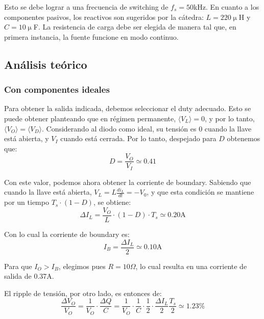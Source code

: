 \documentclass[e4_tp1_main.tex]{subfiles}
\begin{document}
Esto se debe lograr a una frecuencia de switching de $f_s = 50$kHz. En cuanto a los componentes pasivos, los reactivos son sugeridos por la c\'atedra: $L=220\upmu$H y $C=10\upmu$F. La resistencia de carga  debe ser elegida de manera tal que, en primera instancia, la fuente funcione en modo continuo.



\subsection{An\'alisis te\'orico}

\subsubsection{Con componentes ideales}

Para obtener la salida indicada, debemos seleccionar el duty adecuado. Esto se puede obtener planteando que en r\'egimen permanente, $\langle V_L \rangle = 0$, y por lo tanto, $\langle V_O \rangle = \langle V_D \rangle$. Considerando al diodo como ideal, su tensi\'on es 0 cuando la llave est\'a abierta, y $V_I$ cuando est\'a cerrada. Por lo tanto, despejado para $D$ obtenemos que:
\begin{equation}
	D = \frac{V_O}{V_I} \simeq 0.41
\end{equation}  

Con este valor, podemos ahora obtener la corriente de boundary. Sabiendo que cuando la llave est\'a abierta, $V_L = L \frac{di_L}{dt} = -V_0$, y que esta condici\'on se mantiene por un tiempo $T_s \cdot (1-D)$, se obtiene:
\begin{equation}
	\Delta I_L = \frac{V_O}{L} \cdot (1-D) \cdot T_s \simeq 0.20\text{A}
\end{equation} 

Con lo cual la corriente de boundary es:
\begin{equation}
	I_{B} = \frac{\Delta I_L}{2} \simeq 0.10\text{A}
\end{equation}

Para que $I_O > I_B$, elegimos pues $R = 10\Omega$, lo cual resulta en una corriente de salida de 0.37A.

El ripple de tensi\'on, por otro lado, es entonces de:
\begin{equation}
	\frac{\Delta V_O}{V_O} 
	= \frac{1}{V_O} \cdot \frac{\Delta Q}{C} 
	= \frac{1}{V_O} 
	\cdot \frac{1}{C} \cdot \frac{1}{2} \cdot \frac{\Delta I_L}{2} \frac{T_s}{2}
	\simeq 1.23 \%
\end{equation}
\end{document}
